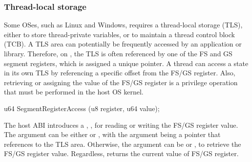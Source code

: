 

\subsubsection*{Thread-local storage}


Some OSes, such as Linux and Windows, requires a thread-local storage (TLS),
either to store thread-private variables, or to maintain a thread control block (TCB).
A TLS area can potentially be frequently accessed by an application or library.
Therefore, on \graphenearch{},
the TLS is often referenced by one of the FS and GS segment registers,
which is assigned a unique pointer.
A thread can access a state in its own TLS by referencing a specific offset from the FS/GS register.
Also, retrieving or assigning the value of the FS/GS register
is a privilege operation
that must be performed in the host OS kernel.







\begin{paldef}
u64 SegmentRegisterAccess (u8 register, u64 value);
\end{paldef}




The host ABI introduces a \hostapi{}, , for reading or writing the FS/GS register value.
The  argument can be either  or ,
with the  argument
being a pointer that references to the TLS area.
Otherwise, the  argument
can be  or ,
to retrieve the FS/GS register value.
Regardless,  returns the current value of FS/GS register.




